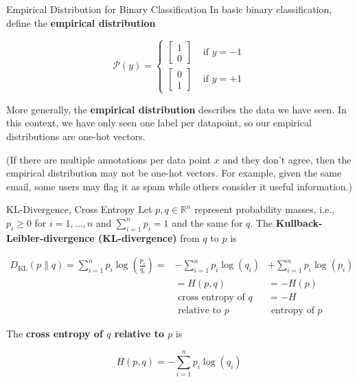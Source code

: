 \begin{frame}[allowframebreaks]

\begin{mydefinitionblock}{3.9}{Empirical Distribution for Binary Classification}
    In basic binary classification, define the \textbf{empirical distribution}

    $$
    \mathcal{P}(y)= \begin{cases}{\left[\begin{array}{l}
    1 \\
    0
    \end{array}\right]} & \text { if } y=-1 \\
    {\left[\begin{array}{l}
    0 \\
    1
    \end{array}\right]} & \text { if } y=+1\end{cases}
    $$

    More generally, the \textbf{empirical distribution} describes the data we have seen.
    In this context, we have only seen one label per datapoint, so our empirical distributions are one-hot vectors.

    (If there are multiple annotations per data point $x$ and they don't agree, then the empirical distribution may not be one-hot vectors.
    For example, given the same email, some users may flag it as spam while others consider it useful information.)
\end{mydefinitionblock}

\end{frame}

\begin{frame}[allowframebreaks]

\begin{mydefinitionblock}{3.10}{KL-Divergence, Cross Entropy}
    Let $p, q \in \mathbb{R}^{n}$ represent probability masses, i.e., $p_{i} \geq 0$ for $i=1, \ldots, n$ and $\sum_{i=1}^{n} p_{i}=1$ and the same for $q$.
    The \textbf{Kullback-Leibler-divergence (KL-divergence)} from $q$ to $p$ is

    $$
    \begin{array}{ll}
    D_{\mathrm{KL}}(p \| q)=\displaystyle \sum_{i=1}^{n} p_{i} \log \left(\frac{p_{i}}{q_{i}}\right)= & -\displaystyle \sum_{i=1}^{n} p_{i} \log \left(q_{i}\right) & +\displaystyle \sum_{i=1}^{n} p_{i} \log \left(p_{i}\right) \\
    & =H(p, q) & =-H(p) \\
    & \text { cross entropy of } q & =-H \\
    & \text { relative to } p & \text { entropy of } p
    \end{array}
    $$

    The \textbf{cross entropy of $q$ relative to $p$} is

    $$
    H(p, q) = -\sum_{i=1}^{n} p_{i} \log \left(q_{i}\right)
    $$
\end{mydefinitionblock}

\end{frame}

